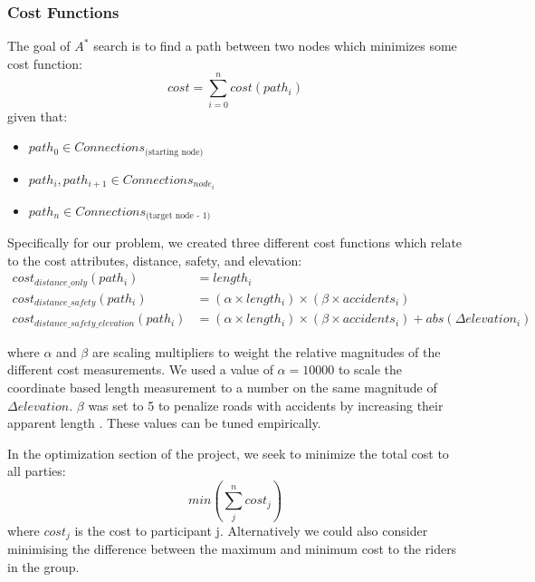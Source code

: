 \documentclass[11pt]{article}
\begin{document}
\subsubsection{Cost Functions}
The goal of $A^{*}$ search is to find a path between two nodes which minimizes some cost function:
\begin{equation}
cost = \sum_{i=0}^n cost(path_i)
\end{equation}
given that:
\begin{itemize}
\item $path_0 \in Connections_{\text{(starting node)}}$
\item $path_i, path_{i+1} \in Connections_{node_i}$
\item $path_n \in Connections_{\text{(target node - 1)}}$
\end{itemize}

\noindent Specifically for our problem, we created three different cost functions which relate to the cost attributes, distance, safety, and elevation:
\begin{align}\label{cost_fns}
cost_{distance\_only}(path_i) &= length_i \\
cost_{distance\_safety}(path_i) &= (\alpha \times length_i) \times  (\beta \times accidents_i) \\
cost_{distance\_safety\_elevation}(path_i) &= (\alpha \times length_i) \times  (\beta \times accidents_i) + abs(\Delta elevation_i)
\end{align}

\noindent  where $\alpha$ and $\beta$ are scaling multipliers to weight the relative magnitudes of the different cost measurements. We used a value of $\alpha = 10000$ to scale the coordinate based length measurement to a number on the same magnitude of $\Delta elevation$. $\beta$ was set to 5 to penalize roads with accidents by increasing their apparent length . These values can be tuned empirically.\par
\noindent In the optimization section of the project, we seek to minimize the total cost to all parties:
\begin{equation}
min(\sum_j^n cost_j)
\end{equation}
where $cost_j$ is the cost to participant j. Alternatively we could also consider minimising the difference between the maximum and minimum cost to the riders in the group. 
\end{document}
